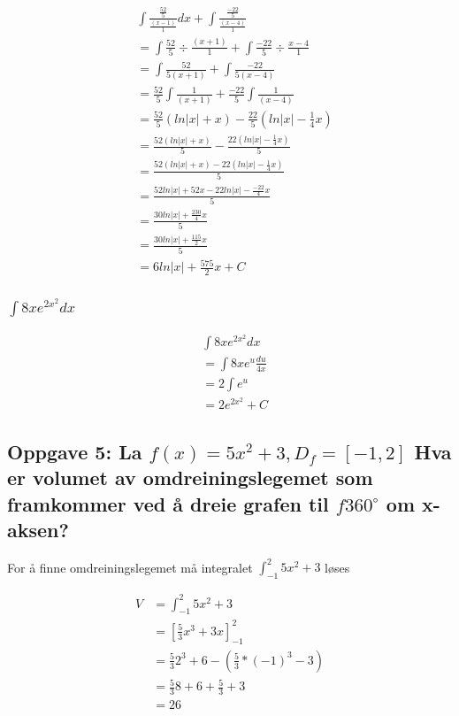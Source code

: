 \documentclass{article}
\begin{document}
\begin{align*}
    & \int \frac{\frac{52}{5}}{\frac{(x-1)}{1}} dx + \int \frac{\frac{-22}{5}}{\frac{(x-4)}{1}} \\
    &= \int \frac{52}{5} \div \frac{(x+1)}{1} + \int \frac{-22}{5} \div \frac{x-4}{1} \\
    &= \int \frac{52}{5(x+1)} + \int \frac{-22}{5(x-4)} \\
    &= \frac{52}{5} \int \frac{1}{(x+1)} + \frac{-22}{5} \int \frac{1}{(x-4)} \\
    &= \frac{52}{5} (ln|x| + x) - \frac{22}{5} (ln|x| - \frac{1}{4}{x}) \\
    &= \frac{52(ln|x| + x)}{5}  - \frac{22(ln|x| - \frac{1}{4}{x})}{5} \\
    &= \frac{52(ln|x| + x) - 22(ln|x| - \frac{1}{4}{x})}{5} \\
    &= \frac{52ln|x| + 52x - 22ln|x| - \frac{-22}{4}{x}}{5} \\
    &= \frac{30ln|x| + \frac{230}{4}x}{5} \\
    &= \frac{30ln|x| + \frac{115}{2}x}{5} \\
    &= 6ln|x| + \frac{575}{2}x+C
\end{align*}

\subsubsection{$\int 8xe^{2x^2}dx$}

\begin{align*}
    & \int 8xe^{2x^2}dx \\
    &= \int 8xe^{u} \frac{du}{4x} \\
    &= 2 \int e^{u} \\ 
    &= 2e^{2x^2} + C
\end{align*}

\subsection{Oppgave 5: La $f(x)=5x^2+3, D_f=[-1, 2]$ Hva er volumet av omdreiningslegemet som framkommer ved å dreie grafen til $f 360^\circ$ om x-aksen?}

For å finne omdreiningslegemet må integralet $\int_{-1}^{2} 5x^2+3$ løses

\begin{align*}
    V &= \int_{-1}^{2} 5x^2+3 \\
    &= [\frac{5}{3}x^3+3x]^{2}_{-1} \\
    &= \frac{5}{3}2^3+6-(\frac{5}{3}*(-1)^3-3) \\
    &= \frac{5}{3}8 + 6 + \frac{5}{3} + 3 \\
    &= 26
\end{align*}
\end{document}
